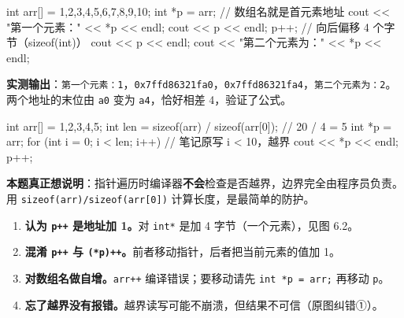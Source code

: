 \documentclass[UTF8,a4paper,11pt,fontset=none,zihao=-4]{ctexart}
\newcommand{\ci}[1]{{\circfont #1}}
\newcommand{\cc}[1]{\texttt{#1}}
\newcommand{\arr}[5][]{%
  \foreach \v [count=\k from 0] in {#4} {\node[acell,#1] (#2-\k) at ($(#3)+(\k*0.9,0)$) {\v};
    \node[idx] at (#2-\k.south) {[\k]};}
  \node[vn] at (#2-0.west) {#5};}
\begin{document}
\begin{examplebox}
\begin{code}
int arr[] = {1,2,3,4,5,6,7,8,9,10};
int *p = arr;                       // 数组名就是首元素地址
cout << "第一个元素：" << *p << endl;
cout << p << endl;
p++;                                // 向后偏移 4 个字节（sizeof(int)）
cout << p << endl;
cout << "第二个元素为：" << *p << endl;
\end{code}
\textbf{实测输出}：\cc{第一个元素：1}，\cc{0x7ffd86321fa0}，\cc{0x7ffd86321fa4}，\cc{第二个元素为：2}。两个地址的末位由 \cc{a0} 变为 \cc{a4}，恰好相差 4，验证了公式。
\end{examplebox}

\begin{examplebox}
\begin{code}
int arr[] = {1,2,3,4,5};
int len = sizeof(arr) / sizeof(arr[0]);   // 20 / 4 = 5
int *p = arr;
for (int i = 0; i < len; i++)             // 笔记原写 i < 10，越界
{
    cout << *p << endl;
    p++;
}
\end{code}
\begin{center}
\end{center}
\textbf{本题真正想说明}：指针遍历时编译器\textbf{不会}检查是否越界，边界完全由程序员负责。用 \cc{sizeof(arr)/sizeof(arr[0])} 计算长度，是最简单的防护。
\end{examplebox}

\begin{warningbox}
\begin{enumerate}
  \item \textbf{认为 \cc{p++} 是地址加 1。}对 \cc{int*} 是加 4 字节（一个元素），见图 6.2。
  \item \textbf{混淆 \cc{p++} 与 \cc{(*p)++}。}前者移动指针，后者把当前元素的值加 1。
  \item \textbf{对数组名做自增。}\cc{arr++} 编译错误；要移动请先 \cc{int *p = arr;} 再移动 \cc{p}。
  \item \textbf{忘了越界没有报错。}越界读写可能不崩溃，但结果不可信（原图纠错\ci{①}）。
\end{enumerate}
\end{warningbox}
\end{document}
